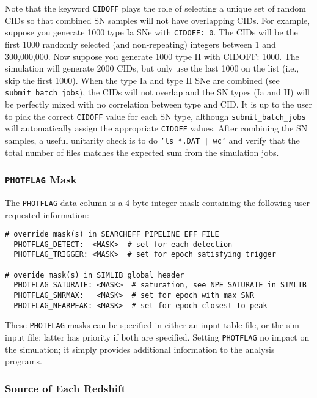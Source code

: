 \documentclass[12pt]{article}
\newcommand{\MXSIM}{300,000,000}
\begin{document}
Note that the keyword {\tt CIDOFF} plays the role of selecting
a unique set of random CIDs so that combined SN samples will 
not have overlapping CIDs. 
For example, suppose you generate 1000 type Ia SNe with {\tt CIDOFF: 0}. 
The CIDs will be the first 1000 randomly
selected (and non-repeating) integers between 1 and \MXSIM.
Now suppose you generate 1000 type II with {CIDOFF: 1000}.
The simulation will generate 2000 CIDs, but only use the last
1000 on the list (i.e., skip the first 1000).
When the type Ia and type II SNe are combined
(see {\tt submit\_batch\_jobs}), the CIDs will not overlap
and the SN types (Ia and II) will be perfectly mixed with no correlation
between type and CID. It is up to the user to pick the correct
{\tt CIDOFF} value for each SN type, although {\tt submit\_batch\_jobs}
will automatically assign the appropriate {\tt CIDOFF} values.
After combining the SN samples, a useful unitarity check is to do 
{\tt `ls *.DAT | wc`}
and verify that the total number of files matches the expected 
sum from the simulation jobs.


   \subsubsection{{\tt PHOTFLAG} Mask}
   \label{sss:PHOTFLAG}

The {\tt PHOTFLAG} data column is a 4-byte integer mask containing
the following user-requested information:
%
\begin{verbatim}
# override mask(s) in SEARCHEFF_PIPELINE_EFF_FILE
  PHOTFLAG_DETECT:  <MASK>  # set for each detection
  PHOTFLAG_TRIGGER: <MASK>  # set for epoch satisfying trigger

# overide mask(s) in SIMLIB global header
  PHOTFLAG_SATURATE: <MASK>  # saturation, see NPE_SATURATE in SIMLIB
  PHOTFLAG_SNRMAX:   <MASK>  # set for epoch with max SNR
  PHOTFLAG_NEARPEAK: <MASK>  # set for epoch closest to peak 
\end{verbatim}
%
These {\tt PHOTFLAG} masks can be specified in either an input
table file, or the sim-input file; latter has priority if both
are specified. Setting {\tt PHOTFLAG} no impact on the simulation;
it simply provides additional information to the analysis programs.


   \subsubsection{Source of Each Redshift}
   \label{sss:redshift_flag}
\end{document}

